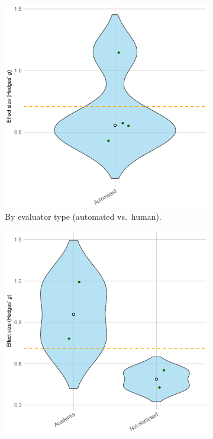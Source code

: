 \documentclass[manuscript, screen, review, acmsmall, anonymous]{acmart}
\begin{document}
\begin{figure}[H]
  \centering
  \begin{subfigure}[t]{0.49\linewidth}
    \centering
    \includegraphics[width=\linewidth]{plot_diversity_raw_violin_Measurement_Evaluator}
    \caption{By evaluator type (automated vs.\ human).}
    \label{fig:diversity_raw_violin_evaluator}
  \end{subfigure}%
  \hfill
  \begin{subfigure}[t]{0.49\linewidth}
    \centering
    \includegraphics[width=\linewidth]{plot_diversity_raw_violin_Participants}

\end{subfigure}
\end{figure}
\end{document}
